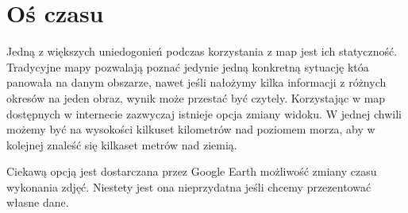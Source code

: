 \section{Oś czasu}
\label{sec:osCzasu}

Jedną z większych uniedogonień podczas korzystania z map jest ich statyczność. Tradycyjne mapy pozwalają poznać jedynie jedną konkretną sytuację któa panowała na danym obszarze, nawet jeśli nałożymy kilka informacji z różnych okresów na jeden obraz, wynik może przestać być czytely. Korzystając w map dostępnych w internecie zazwyczaj istnieje opcja zmiany widoku. W jednej chwili możemy być na wysokości kilkuset kilometrów nad poziomem morza, aby w kolejnej znaleść się kilkaset metrów nad ziemią.

Ciekawą opcją jest dostarczana przez Google Earth możliwość zmiany czasu wykonania zdjęć. Niestety jest ona nieprzydatna jeśli chcemy przezentować własne dane.





